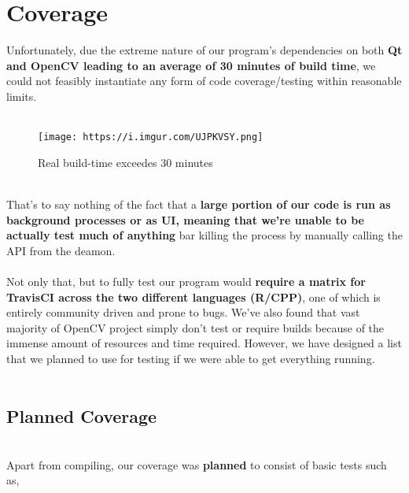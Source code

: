 \documentclass[12pt]{article}
\begin{document}
\section*{Coverage}
Unfortunately, due the extreme nature of our program's dependencies on both \textbf{Qt and OpenCV leading to an average of 30 minutes of build time}, we could not feasibly instantiate any form of code coverage/testing within reasonable limits.\\
\\\begin{figure}[width=0.25\textwidth]
    \centering
    \texttt{[image: https://i.imgur.com/UJPKVSY.png]}
    \caption{Real build-time exceedes 30 minutes}
\end{figure}
\\
That's to say nothing of the fact that a \textbf{large portion of our code is run as background processes or as UI, meaning that we're unable to be actually test much of anything} bar killing the process by manually calling the API from the deamon.
\\
\\Not only that, but to fully test our program would \textbf{require a matrix for TravisCI across the two different languages (R/CPP)}, one of which is entirely community driven and prone to bugs. We've also found that vast majority of OpenCV project simply don't test or require builds because of the immense amount of resources and time required. However, we have designed a list that we planned to use for testing if we were able to get everything running.\\
\pagebreak
\\\subsection*{Planned Coverage}
\\Apart from compiling, our coverage was \textbf{planned} to consist of basic tests such as,
\end{document}
